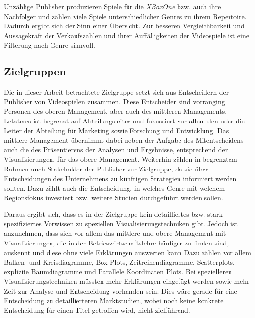 \documentclass[usegeometry=true]{scrartcl}
\begin{document}
Unzählige Publisher produzieren Spiele für die \textit{XBoxOne} bzw. auch ihre Nachfolger und zählen viele Spiele unterschiedlicher Genres zu ihrem Repertoire.
Dadurch ergibt sich der Sinn einer Übersicht.
Zur besseren Vergleichbarkeit und Aussagekraft der Verkaufszahlen und ihrer Auffälligkeiten der Videospiele ist eine Filterung nach Genre sinnvoll.


\subsection{Zielgruppen}
Die in dieser Arbeit betrachtete Zielgruppe setzt sich aus Entscheidern der Publisher von Videospielen zusammen. Diese Entscheider sind vorranging Personen des oberen Management, aber auch des mittleren Managements.
Letzteres ist begrenzt auf Abteilungsleiter und fokussiert vor allem den oder die Leiter der Abteilung für Marketing sowie Forschung und Entwicklung. 
Das mittlere Management übernimmt dabei neben der Aufgabe des Mitentscheidens auch die des Präsentierens der Analysen und Ergebnisse, entsprechend der Visualisierungen, für das obere Management.
Weiterhin zählen in begrenztem Rahmen auch Stakeholder der Publisher zur Zielgruppe, da sie über Entscheidungen des Unternehmens zu künftigen Strategien informiert werden sollten. 
Dazu zählt auch die Entscheidung, in welches Genre mit welchem Regionsfokus investiert bzw. weitere Studien durchgeführt werden sollen. 

Daraus ergibt sich, dass es in der Zielgruppe kein detailliertes bzw. stark spezifiziertes Vorwissen zu speziellen Visualisierungstechniken gibt. 
Jedoch ist anzunehmen, dass sich vor allem das mittlere und obere Management mit Visualisierungen, die in der Betrieswirtschaftslehre häufiger zu finden sind, auskennt und diese ohne viele Erklärungen auswerten kann
Dazu zählen vor allem Balken- und Kreisdiagramme, Box Plots, Zeitreihendiagramme, Scatterplots, explizite Baumdiagramme und Parallele Koordinaten Plots. 
Bei spezielleren Visualisierungstechniken müssten mehr Erklärungen eingefügt werden sowie mehr Zeit zur Analyse und Entscheidung vorhanden sein. 
Dies wäre gerade für eine Entscheidung zu detaillierteren Marktstudien, wobei noch keine konkrete Entscheidung für einen Titel getroffen wird, nicht zielführend.
\end{document}
